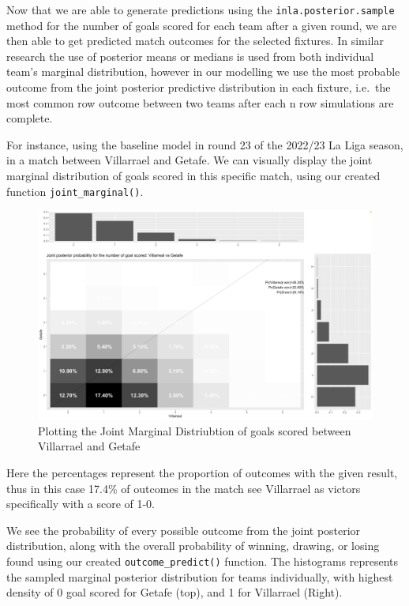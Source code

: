 \documentclass[
]{article}
\begin{document}
Now that we are able to generate predictions using the
\texttt{inla.posterior.sample} method for the number of goals scored for
each team after a given round, we are then able to get predicted match
outcomes for the selected fixtures. In similar research the use of
posterior means or medians is used from both individual team's marginal
distribution, however in our modelling we use the most probable outcome
from the joint posterior predictive distribution in each fixture,
i.e.~the most common row outcome between two teams after each n row
simulations are complete.

For instance, using the baseline model in round 23 of the 2022/23 La
Liga season, in a match between Villarrael and Getafe. We can visually
display the joint marginal distribution of goals scored in this specific
match, using our created function \texttt{joint\_marginal()}.

\begin{figure}
\includegraphics[width=0.9\linewidth,height=0.9\textheight]{getafevillarrael} \caption{Plotting the Joint Marginal Distriubtion of goals scored between Villarrael and Getafe}\label{fig:unnamed-chunk-1}
\end{figure}

Here the percentages represent the proportion of outcomes with the given
result, thus in this case 17.4\% of outcomes in the match see Villarrael
as victors specifically with a score of 1-0.

We see the probability of every possible outcome from the joint
posterior distribution, along with the overall probability of winning,
drawing, or losing found using our created \texttt{outcome\_predict()}
function. The histograms represents the sampled marginal posterior
distribution for teams individually, with highest density of 0 goal
scored for Getafe (top), and 1 for Villarrael (Right).
\end{document}
